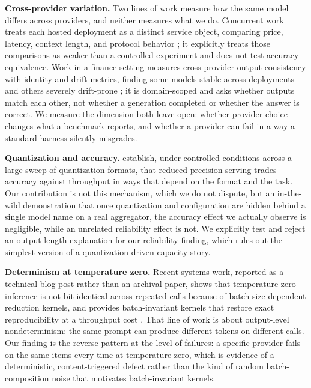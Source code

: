 \documentclass[11pt]{article}
\begin{document}
\textbf{Cross-provider variation.} Two lines of work measure how the
same model differs across providers, and neither measures what we do.
Concurrent work treats each hosted deployment as a distinct service
object, comparing price, latency, context length, and protocol
behavior \citep{same_model_service2026}; it explicitly treats those
comparisons as weaker than a controlled experiment and does not test
accuracy equivalence. Work in a finance setting measures cross-provider
output consistency with identity and drift metrics, finding some
models stable across deployments and others severely
drift-prone \citep{output_drift2025}; it is domain-scoped and asks
whether outputs match each other, not whether a generation completed
or whether the answer is correct. We measure the dimension both leave
open: whether provider choice changes what a benchmark reports, and
whether a provider can fail in a way a standard harness silently
misgrades.

\textbf{Quantization and accuracy.} \citet{quantization_accuracy2025}
establish, under controlled conditions across a large sweep of
quantization formats, that reduced-precision serving trades accuracy
against throughput in ways that depend on the format and the task. Our contribution is not
this mechanism, which we do not dispute, but an in-the-wild
demonstration that once quantization and configuration are hidden
behind a single model name on a real aggregator, the accuracy effect
we actually observe is negligible, while an unrelated reliability
effect is not. We explicitly test and reject an output-length
explanation for our reliability finding, which rules out the simplest
version of a quantization-driven capacity story.

\textbf{Determinism at temperature zero.} Recent systems work, reported
as a technical blog post rather than an archival paper, shows that
temperature-zero inference is not bit-identical across repeated calls
because of batch-size-dependent reduction kernels, and provides
batch-invariant kernels that restore exact reproducibility at a
throughput cost \citep{thinking_machines2025}. That line of work is
about output-level nondeterminism: the same prompt can produce
different tokens on different calls. Our finding is the reverse
pattern at the level of failures: a specific provider fails on the
same items every time at temperature zero, which is evidence of a
deterministic, content-triggered defect rather than the kind of
random batch-composition noise that motivates batch-invariant
kernels.
\end{document}
